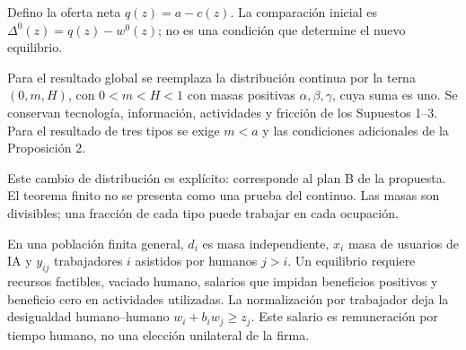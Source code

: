 \documentclass[11pt]{article}
\newcommand{\q}{q}\newcommand{\wv}{w^V}\newcommand{\vL}{v_L}\newcommand{\vM}{v_M}
\begin{document}
Defino la oferta neta $\q(z)=a-c(z)$. La comparación inicial es $\Delta^0(z)=\q(z)-w^0(z)$; no es una condición que determine el nuevo equilibrio.

\begin{assumption}\label{ass:finite}
Para el resultado global se reemplaza la distribución continua por la terna $(0,m,H)$, con $0<m<H<1$ con masas positivas $\alpha,\beta,\gamma$, cuya suma es uno. Se conservan tecnología, información, actividades y fricción de los Supuestos 1--3. Para el resultado de tres tipos se exige $m<a$ y las condiciones adicionales de la Proposición 2.
\end{assumption}
Este cambio de distribución es explícito: corresponde al plan B de la propuesta. El teorema finito no se presenta como una prueba del continuo. Las masas son divisibles; una fracción de cada tipo puede trabajar en cada ocupación.

En una población finita general, $d_i$ es masa independiente, $x_i$ masa de usuarios de IA y $y_{ij}$ trabajadores $i$ asistidos por humanos $j>i$. Un equilibrio requiere recursos factibles, vaciado humano, salarios que impidan beneficios positivos y beneficio cero en actividades utilizadas. La normalización por trabajador deja la desigualdad humano--humano $w_i+b_iw_j\geq z_j$. Este salario es remuneración por tiempo humano, no una elección unilateral de la firma.
\newpage
\end{document}
